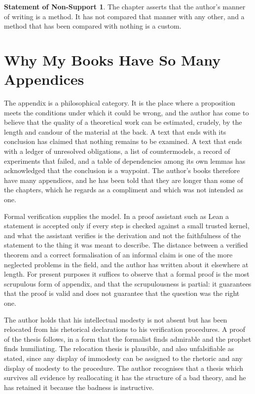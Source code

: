 \documentclass[11pt,openany,twoside]{book}
\theoremstyle{plain}
\theoremstyle{definition}
\newtheorem{nonsupport}{Statement of Non-Support}
\theoremstyle{remark}
\begin{document}
\begin{nonsupport}
The chapter asserts that the author's manner of writing is a method. It has not compared that manner with any other, and a method that has been compared with nothing is a custom.
\end{nonsupport}

\chapter{Why My Books Have So Many Appendices}

The appendix is a philosophical category. It is the place where a proposition meets the conditions under which it could be wrong, and the author has come to believe that the quality of a theoretical work can be estimated, crudely, by the length and candour of the material at the back. A text that ends with its conclusion has claimed that nothing remains to be examined. A text that ends with a ledger of unresolved obligations, a list of countermodels, a record of experiments that failed, and a table of dependencies among its own lemmas has acknowledged that the conclusion is a waypoint. The author's books therefore have many appendices, and he has been told that they are longer than some of the chapters, which he regards as a compliment and which was not intended as one.

Formal verification supplies the model. In a proof assistant such as Lean a statement is accepted only if every step is checked against a small trusted kernel, and what the assistant verifies is the derivation and not the faithfulness of the statement to the thing it was meant to describe. The distance between a verified theorem and a correct formalisation of an informal claim is one of the more neglected problems in the field, and the author has written about it elsewhere at length. For present purposes it suffices to observe that a formal proof is the most scrupulous form of appendix, and that the scrupulousness is partial: it guarantees that the proof is valid and does not guarantee that the question was the right one.

The author holds that his intellectual modesty is not absent but has been relocated from his rhetorical declarations to his verification procedures. A proof of the thesis follows, in a form that the formalist finds admirable and the prophet finds humiliating. The relocation thesis is plausible, and also unfalsifiable as stated, since any display of immodesty can be assigned to the rhetoric and any display of modesty to the procedure. The author recognises that a thesis which survives all evidence by reallocating it has the structure of a bad theory, and he has retained it because the badness is instructive.
\end{document}
